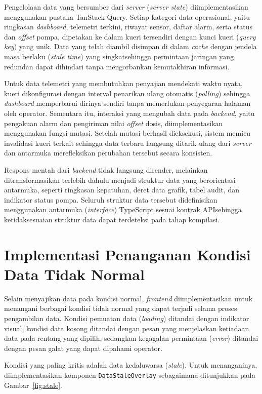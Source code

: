 Pengelolaan data yang bersumber dari \textit{server} (\textit{server state}) diimplementasikan menggunakan pustaka 
TanStack Query. Setiap kategori data operasional, yaitu ringkasan \textit{dashboard}, telemetri terkini, riwayat 
sensor, daftar alarm, serta status dan \textit{offset} pompa, dipetakan ke dalam kueri tersendiri dengan kunci 
kueri (\textit{query key}) yang unik. Data yang telah diambil disimpan di dalam \textit{cache} dengan jendela masa 
berlaku (\textit{stale time}) yang singkatsehingga permintaan jaringan yang redundan dapat dihindari tanpa 
mengorbankan kemutakhiran informasi.

Untuk data telemetri yang membutuhkan penyajian mendekati waktu nyata, kueri dikonfigurasi dengan interval 
penarikan ulang otomatis (\textit{polling}) sehingga \textit{dashboard} memperbarui dirinya sendiri tanpa 
memerlukan penyegaran halaman oleh operator. Sementara itu, interaksi yang mengubah data pada \textit{backend}, 
yaitu pengakuan alarm dan pengiriman nilai \textit{offset} dosis, diimplementasikan menggunakan fungsi mutasi. 
Setelah mutasi berhasil dieksekusi, sistem memicu invalidasi kueri terkait sehingga data terbaru langsung ditarik 
ulang dari \textit{server} dan antarmuka merefleksikan perubahan tersebut secara konsisten.

Respons mentah dari \textit{backend} tidak langsung dirender, melainkan ditransformasikan terlebih dahulu menjadi 
struktur data yang berorientasi antarmuka, seperti ringkasan kepatuhan, deret data grafik, tabel audit, dan 
indikator status pompa. Seluruh struktur data tersebut didefinisikan menggunakan antarmuka (\textit{interface}) 
TypeScript sesuai kontrak APIsehingga ketidaksesuaian struktur data dapat terdeteksi pada tahap kompilasi.

\section{Implementasi Penanganan Kondisi Data Tidak Normal}
Selain menyajikan data pada kondisi normal, \textit{frontend} diimplementasikan untuk menangani berbagai kondisi 
tidak normal yang dapat terjadi selama proses pengambilan data. Kondisi pemuatan data (\textit{loading}) ditandai 
dengan indikator visual, kondisi data kosong ditandai dengan pesan yang menjelaskan ketiadaan data pada rentang 
yang dipilih, sedangkan kegagalan permintaan (\textit{error}) ditandai dengan pesan galat yang dapat dipahami operator.

Kondisi yang paling kritis adalah data kedaluwarsa (\textit{stale}). Untuk menanganinya, diimplementasikan 
komponen \texttt{DataStaleOverlay} sebagaimana ditunjukkan pada Gambar~\ref{fig:stale}.


